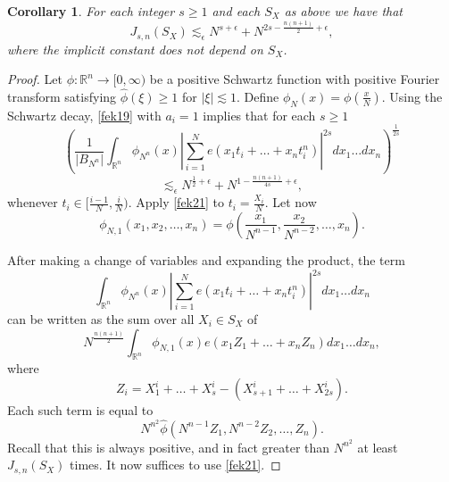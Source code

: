 \documentclass[amssymb,amsfonts,12pt]{amsart}
\newtheorem{corollary}[theorem]{Corollary}
\def\R{{\mathbb R}}
\begin{document}
\begin{corollary}
\label{cfek4}
For each integer $s\ge 1$ and each $S_X$ as above we have that
$${J}_{s,n}(S_X)\lesssim_\epsilon N^{s+\epsilon}+N^{2s-\frac{n(n+1)}{2}+\epsilon},$$
where the implicit constant does not depend on $S_X$.
\end{corollary}
\begin{proof}Let $\phi:\R^n\to [0,\infty)$ be a positive Schwartz function with  positive Fourier transform  satisfying $\widehat{\phi}(\xi)\ge1$ for $|\xi|\lesssim 1$.
Define $\phi_{N}(x)=\phi(\frac{x}N)$. Using the Schwartz decay, \eqref{fek19} with $a_{i}=1$ implies that for each $s\ge 1$
$$(\frac1{|B_{N^n}|}\int_{\R^n}\phi_{N^n}(x)|\sum_{i=1}^Ne(x_1t_i+\ldots+x_nt_i^n)|^{2s}dx_1\ldots dx_n)^{\frac1{2s}}$$
\begin{equation}
\label{fek21}
\lesssim_\epsilon N^{\frac12+\epsilon}+N^{1-\frac{n(n+1)}{4s}+\epsilon},
\end{equation}
whenever $t_i\in [\frac{i-1}{N},\frac{i}{N})$. Apply \eqref{fek21} to $t_i=\frac{X_i}{N}$.
Let now $$\phi_{N, 1}(x_1,x_2,\ldots,x_n)=\phi(\frac{x_1}{N^{n-1}},\frac{x_2}{N^{n-2}},\ldots,{x_n}).$$

After making a change of variables and expanding the product,  the term
$$\int_{\R^n}\phi_{N^n}(x)|\sum_{i=1}^Ne(x_1t_i+\ldots+x_nt_i^n)|^{2s}dx_1\ldots dx_n$$
can be written as  the sum over all $X_i\in S_X$ of
$$N^{\frac{n(n+1)}{2}}\int_{\R^n}\phi_{N, 1}(x)e(x_1Z_1+\ldots+x_nZ_n)dx_1\ldots dx_n,$$
where
$$Z_i=X_1^i+\ldots+X_s^i-(X_{s+1}^i+\ldots+X_{2s}^i).$$
Each such term is equal to
$$N^{n^2}\widehat{\phi}(N^{n-1}Z_1,N^{n-2}Z_2,\ldots,Z_n).$$
Recall that this is always positive, and in fact greater than $N^{n^2}$ at least ${J}_{s,n}(S_X)$ times. It now suffices to use \eqref{fek21}.
\end{proof}


\bigskip
\end{document}
